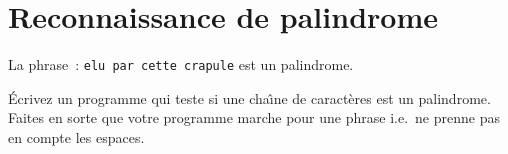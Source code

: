 \section{Reconnaissance de palindrome}
  La phrase~: \verb+elu par cette crapule+ est un palindrome.
  \par
  \'Ecrivez un programme qui teste  si une cha\^\i{}ne de caract\`eres
  est  un palindrome. Faites en sorte  que votre programme marche pour
  une phrase i.e.\ ne prenne pas en compte les espaces.
